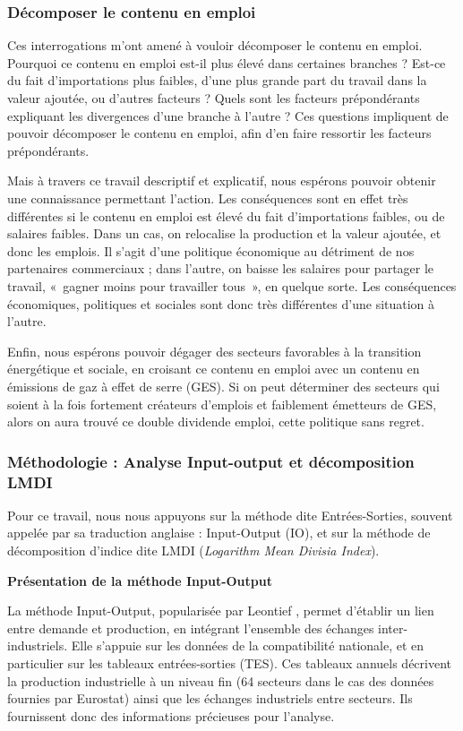 \subsubsection{Décomposer le contenu en emploi}

Ces interrogations m’ont amené à vouloir décomposer le contenu en emploi. Pourquoi ce contenu en emploi est-il plus élevé dans certaines branches ? Est-ce du fait d’importations plus faibles, d’une plus grande part du travail dans la valeur ajoutée, ou d’autres facteurs ? Quels sont les facteurs prépondérants expliquant les divergences d’une branche à l’autre ?
Ces questions impliquent de pouvoir décomposer le contenu en emploi, afin d'en faire ressortir les facteurs prépondérants.

Mais à travers ce travail descriptif et explicatif, nous espérons pouvoir obtenir une connaissance permettant l’action. Les conséquences sont en effet très différentes si le contenu en emploi est élevé du fait d’importations faibles, ou de salaires faibles. Dans un cas, on relocalise la production et la valeur ajoutée, et donc les emplois. Il s’agit d’une politique économique au détriment de nos partenaires commerciaux ; dans l’autre, on baisse les salaires pour partager le travail, «~gagner moins pour travailler tous~», en quelque sorte. Les conséquences économiques, politiques et sociales sont donc très différentes d’une situation à l’autre.

Enfin, nous espérons pouvoir dégager des secteurs favorables à la transition énergétique et sociale, en croisant ce contenu en emploi avec un contenu en émissions de gaz à effet de serre (GES). Si on peut déterminer des secteurs qui soient à la fois fortement créateurs d’emplois et faiblement émetteurs de GES, alors on aura trouvé ce double dividende emploi, cette politique sans regret. 


\subsubsection{Méthodologie : Analyse Input-output et décomposition LMDI}

Pour ce travail, nous nous appuyons sur la méthode dite Entrées-Sorties, souvent appelée par sa traduction anglaise : Input-Output (IO), et sur la méthode de décomposition d'indice dite LMDI (\textit{Logarithm Mean Divisia Index}).

\vspace{1em}
\textbf{Présentation de la méthode Input-Output}

La méthode Input-Output, popularisée par Leontief \citep{Leontief1941}, permet d'établir un lien entre demande et production, en intégrant l'ensemble des échanges inter-industriels.
Elle s'appuie sur les données de la compatibilité nationale, et en particulier sur les tableaux entrées-sorties (TES). Ces tableaux annuels décrivent la production industrielle à un niveau fin (64 secteurs dans le cas des données fournies par Eurostat) ainsi que les échanges industriels entre secteurs. Ils fournissent donc des informations précieuses pour l'analyse.

